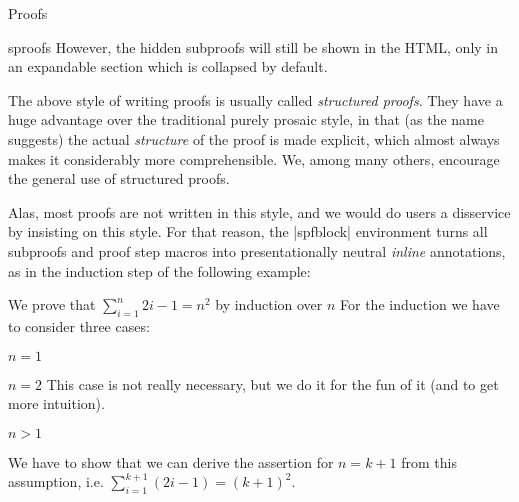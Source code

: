 \begin{sfragment}{Proofs}
\begin{smodule}{sproofs}
  However, the hidden subproofs will still be shown in the HTML,
  only in an expandable section which is collapsed by default.

\end{smodule}

The above style of writing proofs is usually called \emph{structured proofs}.
They have a huge advantage over the traditional purely prosaic style,
in that (as the name suggests) the actual \emph{structure} of the proof
is made explicit, which almost always makes it considerably more 
comprehensible. We, among many others, encourage the general use of 
structured proofs.

Alas, most proofs are not written in this style, and we would
do users a disservice by insisting on this style. For that reason,
the |spfblock| environment turns all subproofs and proof step
macros into presentationally neutral \emph{inline} annotations,
as in the induction step of the following example:

\begin{latexcode}
\begin{sproof}[id=simple-proof,method=induction]
   {We prove that $\sum_{i=1}^n{2i-1}=n^{2}$ by induction over $n$}
  For the induction we have to consider three cases: %
   \begin{subproof}{$n=1$}
   \end{subproof}
   \begin{subproof}{$n=2$}
        This case is not really necessary, but we do it for the
        fun of it (and to get more intuition).
   \end{subproof}
   \begin{subproof}{$n>1$}\begin{spfblock}
      
        We have to show that we can derive the assertion for $n=k+1$ from
        this assumption, i.e. $\sum_{i=1}^{k+1}{(2i-1)}=(k+1)^{2}$.

   \end{spfblock}\end{subproof}
\end{sproof}
\end{latexcode}


\end{sfragment}
